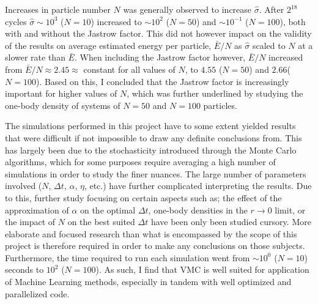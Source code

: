 \documentclass[%
oneside,                 %
final,                   %
10pt]{article}
\begin{document}
Increases in particle number $N$ was generally observed to increase $\hat \sigma$. After $2^{18}$ cycles $\hat \sigma \sim 10^3$ ($N=10$) increased to $\sim 10^2$ ($N=50$) and $\sim 10^{-1}$ ($N=100$), both with and without the Jastrow factor. This did not however impact on the validity of the results on average estimated energy per particle, $\bar E/N$ as $\hat \sigma$ scaled to $N$ at a slower rate than $\bar E$. When including the Jastrow factor however, $\bar E/N$ increased from $\bar E/N\approx2.45\approx$ constant for all values of $N$, to $4.55$ ($N=50$) and $2.66$($N=100$). Based on this, I concluded that the Jastrow factor is increasingly important for higher values of $N$, which was further underlined by studying the one-body density of systems of $N=50$ and $N=100$ particles.

The simulations performed in this project have to some extent yielded results that were difficult if not impossible to draw any definite conclusions from. This has largely been due to the stochasticity introduced through the Monte Carlo algorithms, which for some purposes require averaging a high number of simulations in order to study the finer nuances. The large number of parameters involved ($N$, $\Delta t$, $\alpha$, $\eta$, etc.) have further complicated interpreting the results. Due to this, further study focusing on certain aspects such as; the effect of the approximation of $\alpha$ on the optimal $\Delta t$, one-body densities in the $r\rightarrow 0$ limit, or the impact of $N$ on the best suited $\Delta t$ have been only been studied cursory. More elaborate and focused research than what is encompassed by the scope of this project is therefore required in order to make any conclusions on those subjects. Furthermore, the time required to run each simulation went from $\sim 10^0$ ($N=10$) seconds to $10^2$ ($N=100$). As such, I find that VMC is well suited for application of Machine Learning methods, especially in tandem with well optimized and parallelized code. 

 \label{refer}

\end{document}
